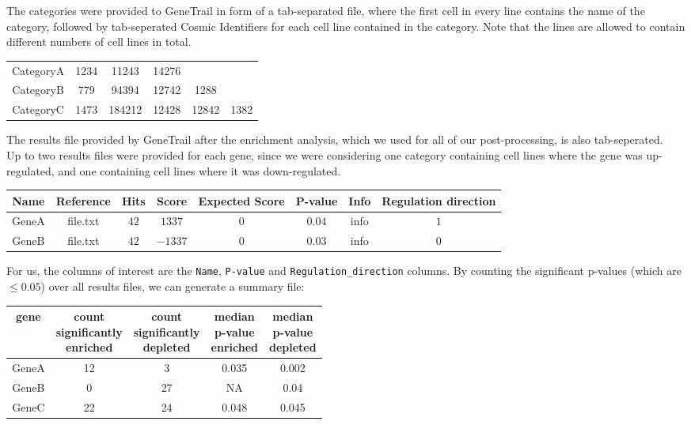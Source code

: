The categories were provided to GeneTrail in form of a tab-separated file, where the first cell in every line contains the name of the category, followed by tab-seperated Cosmic Identifiers for each cell line contained in the category. Note that the lines are allowed to contain different numbers of cell lines in total.\\
\begin{table}[H]
    \begin{tabular}{|c|ccccc|}
        \hline
        CategoryA&1234&11243&14276&&\\
        CategoryB&779&94394&12742&1288&\\
        CategoryC&1473&184212&12428&12842&1382\\
        \hline
    \end{tabular}
\end{table}
The results file provided by GeneTrail after the enrichment analysis, which we used for all of our post-processing, is also tab-seperated.\\
Up to two results files were provided for each gene, since we were considering one category containing cell lines where the gene was up-regulated, and one containing cell lines where it was down-regulated.\\
\begin{table}[H]
    \begin{tabular}{|c|c|c|c|c|c|c|c|}
        \hline
        Name&Reference&Hits&Score&Expected Score&P-value&Info&Regulation direction\\
        \hline
        GeneA&file.txt&$42$&$1337$&$0$&$0.04$&info&$1$\\
        GeneB&file.txt&$42$&$-1337$&$0$&$0.03$&info&$0$\\
        \hline
    \end{tabular}
\end{table}
For us, the columns of interest are the \lstinline|Name|, \lstinline|P-value| and \lstinline|Regulation_direction| columns. By counting the significant p-values (which are $\leq 0.05$) over all results files, we can generate a summary file:
\begin{table}[H]
    \begin{tabular}{|c|cc|cc|}
        \hline
        gene&\makecell{count\\significantly\\enriched}&\makecell{count\\significantly\\depleted}&\makecell{median\\p-value\\enriched}&\makecell{median\\p-value\\depleted}\\
        \hline
        GeneA&12&3&0.035&0.002\\
        GeneB&0&27&NA&0.04\\
        GeneC&22&24&0.048&0.045\\
        \hline
    \end{tabular}
\end{table}